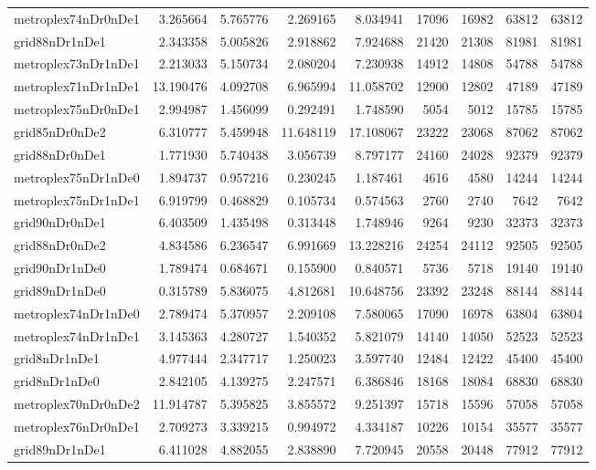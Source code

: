 \begin{longtable}{|l|r|r|r|r|r|r|r|r|}
metroplex74nDr0nDe1 & 3.265664 & 5.765776 & 2.269165 & 8.034941 & 17096 & 16982 & 63812 & 63812 \\
grid88nDr1nDe1 & 2.343358 & 5.005826 & 2.918862 & 7.924688 & 21420 & 21308 & 81981 & 81981 \\
metroplex73nDr1nDe1 & 2.213033 & 5.150734 & 2.080204 & 7.230938 & 14912 & 14808 & 54788 & 54788 \\
metroplex71nDr1nDe1 & 13.190476 & 4.092708 & 6.965994 & 11.058702 & 12900 & 12802 & 47189 & 47189 \\
metroplex75nDr0nDe1 & 2.994987 & 1.456099 & 0.292491 & 1.748590 & 5054 & 5012 & 15785 & 15785 \\
grid85nDr0nDe2 & 6.310777 & 5.459948 & 11.648119 & 17.108067 & 23222 & 23068 & 87062 & 87062 \\
grid88nDr0nDe1 & 1.771930 & 5.740438 & 3.056739 & 8.797177 & 24160 & 24028 & 92379 & 92379 \\
metroplex75nDr1nDe0 & 1.894737 & 0.957216 & 0.230245 & 1.187461 & 4616 & 4580 & 14244 & 14244 \\
metroplex75nDr1nDe1 & 6.919799 & 0.468829 & 0.105734 & 0.574563 & 2760 & 2740 & 7642 & 7642 \\
grid90nDr0nDe1 & 6.403509 & 1.435498 & 0.313448 & 1.748946 & 9264 & 9230 & 32373 & 32373 \\
grid88nDr0nDe2 & 4.834586 & 6.236547 & 6.991669 & 13.228216 & 24254 & 24112 & 92505 & 92505 \\
grid90nDr1nDe0 & 1.789474 & 0.684671 & 0.155900 & 0.840571 & 5736 & 5718 & 19140 & 19140 \\
grid89nDr1nDe0 & 0.315789 & 5.836075 & 4.812681 & 10.648756 & 23392 & 23248 & 88144 & 88144 \\
metroplex74nDr1nDe0 & 2.789474 & 5.370957 & 2.209108 & 7.580065 & 17090 & 16978 & 63804 & 63804 \\
metroplex74nDr1nDe1 & 3.145363 & 4.280727 & 1.540352 & 5.821079 & 14140 & 14050 & 52523 & 52523 \\
grid8nDr1nDe1 & 4.977444 & 2.347717 & 1.250023 & 3.597740 & 12484 & 12422 & 45400 & 45400 \\
grid8nDr1nDe0 & 2.842105 & 4.139275 & 2.247571 & 6.386846 & 18168 & 18084 & 68830 & 68830 \\
metroplex70nDr0nDe2 & 11.914787 & 5.395825 & 3.855572 & 9.251397 & 15718 & 15596 & 57058 & 57058 \\
metroplex76nDr0nDe1 & 2.709273 & 3.339215 & 0.994972 & 4.334187 & 10226 & 10154 & 35577 & 35577 \\
grid89nDr1nDe1 & 6.411028 & 4.882055 & 2.838890 & 7.720945 & 20558 & 20448 & 77912 & 77912 \\

\end{longtable}
